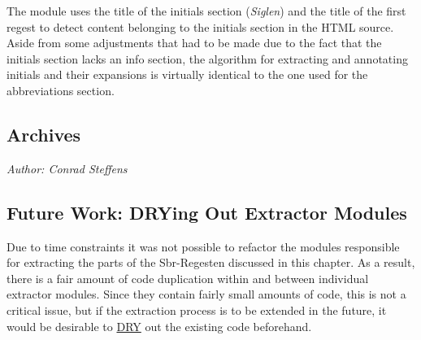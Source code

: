 The \texttt{} module uses the title of the initials section
(\emph{Siglen}) and the title of the first regest to detect content
belonging to the initials section in the HTML source. Aside from some
adjustments that had to be made due to the fact that the initials
section lacks an info section, the algorithm for extracting and
annotating initials and their expansions is virtually identical to the
one used for the abbreviations section.

\subsection{Archives}
\label{sec:archives}

\emph{Author: Conrad Steffens} \\

\subsection{Future Work: DRYing Out Extractor Modules}
\label{sec:future-work-other}

Due to time constraints it was not possible to refactor the modules
responsible for extracting the parts of the Sbr-Regesten discussed in
this chapter. As a result, there is a fair amount of code duplication
within and between individual extractor modules. Since they contain
fairly small amounts of code, this is not a critical issue, but if the
extraction process is to be extended in the future, it would be
desirable to
\href{https://en.wikipedia.org/wiki/Don't_repeat_yourself}{DRY} out
the existing code beforehand.
